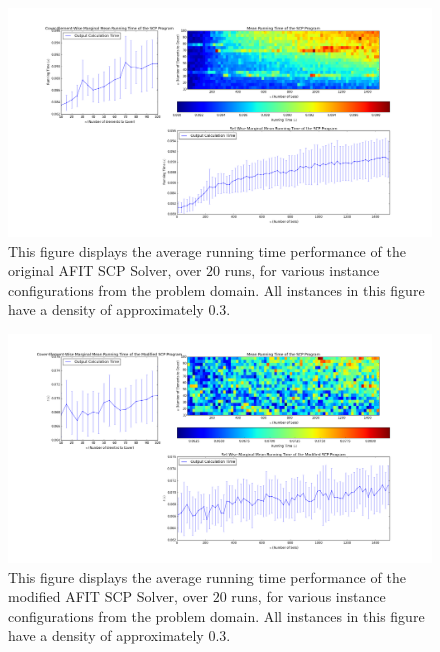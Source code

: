 \documentclass[12pt]{article}
\begin{document}
	\begin{figure}[ht!]\label{fig:runtime_analysis_original_density0p3}
		
		\centering
		\centerline{\includegraphics[width = 6.7in]{running_time_original_density0p3.png}}
		\hfill
		
		\caption{This figure displays the average running time performance of the original AFIT SCP Solver, over $20$ runs, for various instance configurations from the problem domain. All instances in this figure have a density of approximately $0.3$.}
		
	\end{figure}
	
	\begin{figure}[ht!]\label{fig:runtime_analysis_modified_density0p3}
		
		\centering
		\centerline{\includegraphics[width = 6.7in]{running_time_modified_density0p3_noout_noH1.png}}
		\hfill
		
		\caption{This figure displays the average running time performance of the modified AFIT SCP Solver, over $20$ runs, for various instance configurations from the problem domain. All instances in this figure have a density of approximately $0.3$.}
		
	\end{figure}
	
\end{document}
